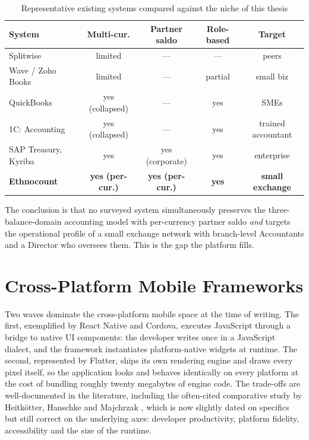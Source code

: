 {\singlespacing
\begin{table}[h]
  \caption{Representative existing systems compared against the niche of this thesis}
  \label{tab:soa}
  \centering
  \begin{tabular}{lcccc}
    \toprule
    \textbf{System}      & \textbf{Multi-cur.} & \textbf{Partner saldo} & \textbf{Role-based} & \textbf{Target}\\
    \midrule
    Splitwise            & limited             & ---                    & ---                  & peers\\
    Wave / Zoho Books    & limited             & ---                    & partial              & small biz\\
    QuickBooks           & yes (collapsed)     & ---                    & yes                  & SMEs\\
    1C: Accounting       & yes (collapsed)     & ---                    & yes                  & trained accountant\\
    SAP Treasury, Kyriba & yes                 & yes (corporate)        & yes                  & enterprise\\
    \textbf{Ethnocount}  & \textbf{yes (per-cur.)} & \textbf{yes (per-cur.)} & \textbf{yes} & \textbf{small exchange}\\
    \bottomrule
  \end{tabular}
\end{table}
}

The conclusion is that no surveyed system simultaneously preserves the three-balance-domain accounting model with per-currency partner saldo \emph{and} targets the operational profile of a small exchange network with branch-level Accountants and a Director who oversees them. This is the gap the platform fills.

\section{Cross-Platform Mobile Frameworks}
\label{sec:crossplatform}

Two waves dominate the cross-platform mobile space at the time of writing. The first, exemplified by React Native and Cordova, executes JavaScript through a bridge to native UI components: the developer writes once in a JavaScript dialect, and the framework instantiates platform-native widgets at runtime. The second, represented by Flutter, ships its own rendering engine and draws every pixel itself, so the application looks and behaves identically on every platform at the cost of bundling roughly twenty megabytes of engine code. The trade-offs are well-documented in the literature, including the often-cited comparative study by Heitk{\"o}tter, Hanschke and Majchrzak \cite{heitkotter2013}, which is now slightly dated on specifics but still correct on the underlying axes: developer productivity, platform fidelity, accessibility and the size of the runtime.

